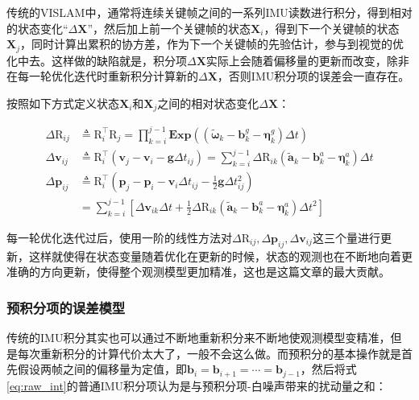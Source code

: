 传统的VISLAM中，通常将连续关键帧之间的一系列IMU读数进行积分，得到相对的状态变化“$\Delta\mathbf X$”，然后加上前一个关键帧的状态$\mathbf{X}_i$，得到下一个关键帧的状态$\mathbf{X}_j$，同时计算出累积的协方差，作为下一个关键帧的先验估计，参与到视觉的优化中去。这样做的缺陷就是，积分项$\Delta\mathbf X$实际上会随着偏移量的更新而改变，除非在每一轮优化迭代时重新积分计算新的$\Delta\mathbf X$，否则IMU积分项的误差会一直存在。

按照如下方式定义状态$\mathbf{X}_i$和$\mathbf{X}_j$之间的相对状态变化$\Delta\mathbf X$：

\begin{equation}
\begin{aligned}
    \Delta\mathrm{R}_{ij}
  &\triangleq \mathrm{R}_i^\top \mathrm{R}_j
  = \prod_{k=i}^{j-1}
  \bm{Exp}\left(
      (\tilde{\bm \omega}_k - \mathbf{b}_k^g - \bm{\eta}_k^g) \Delta t
  \right) \\
  \Delta\mathbf{v}_{ij}
  &\triangleq \mathrm{R}_i^\top (\mathbf{v}_j - \mathbf{v}_i - \mathbf{g} \Delta t_{ij})
  = \sum_{k=i}^{j-1}
  \Delta\mathrm{R}_{ik}
  (\tilde{\mathbf a}_k - \mathbf{b}_k^a - \bm\eta_k^a) \Delta t \\
  \Delta\mathbf{p}_{ij}
  &\triangleq \mathrm{R}_i^\top
  \left(
      \mathbf{p}_j - \mathbf{p}_i -
      \mathbf{v}_i \Delta t_{ij} -
      \frac{1}{2} \mathbf{g} \Delta t_{ij}^2
  \right) \\
  &=           \sum_{k=i}^{j-1}
  \left[
      \Delta\mathbf{v}_{ik} \Delta t +
      \frac{1}{2} \Delta\mathrm{R}_{ik}
      (\tilde{\mathbf a}_k - \mathbf{b}_k^a - \bm\eta_k^a) \Delta t^2
  \right]
\end{aligned}\label{eq:raw_int}
\end{equation}

每一轮优化迭代过后，使用一阶的线性方法对$\Delta\mathrm{R}_{ij}, \Delta\mathbf{p}_{ij}, \Delta\mathbf{v}_{ij}$这三个量进行更新，这样就使得在状态变量随着优化在更新的时候，状态的观测也在不断地向着更准确的方向更新，使得整个观测模型更加精准，这也是这篇文章的最大贡献。

\subsubsection*{预积分项的误差模型}

传统的IMU积分其实也可以通过不断地重新积分来不断地使观测模型变精准，但是每次重新积分的计算代价太大了，一般不会这么做。而预积分的基本操作就是首先假设两帧之间的偏移量为定值，即$\mathbf{b}_i = \mathbf{b}_{i+1} = \cdots = \mathbf{b}_{j-1}$，然后将式\eqref{eq:raw_int}的普通IMU积分项认为是与预积分项-白噪声带来的扰动量之和：

